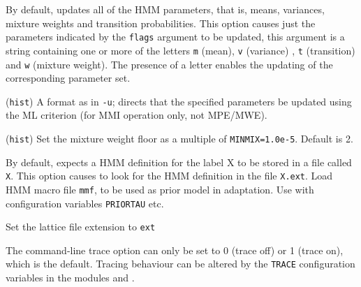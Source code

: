 \begin{optlist}
   By default,  updates all of the HMM parameters,
      that is, means, variances, mixture weights and 
      transition probabilities. This 
      option causes just the parameters indicated by the {\tt flags}
      argument to be updated, this argument is a string containing one
      or more of the letters {\tt m} (mean), {\tt v} (variance) ,
      {\tt t} (transition) and {\tt w} (mixture weight).  The 
      presence of a letter enables
      the updating of the corresponding parameter set.

   (\texttt{hist}) A format as in \texttt{-u}; directs that the specified parameters
     be updated using the ML criterion (for MMI operation only, not MPE/MWE).

   (\texttt{hist}) Set the mixture weight floor as a multiple
    of \texttt{MINMIX=1.0e-5}.  Default is 2.

    By default,  expects a HMM definition for 
      the label X to be stored in a file called {\tt X}.  This
      option causes  to look for the HMM definition in the
      file {\tt X.ext}.
\stdoptB
\stdoptE
\stdoptF
\stdoptH
{}  Load HMM macro file {\tt mmf}, to be used as prior model in adaptation.  Use with configuration variables {\tt PRIORTAU} etc.  
\stdoptI
\stdoptJ
\stdoptM

  Set the lattice file extension to {\tt ext}
\end{optlist}




The command-line trace option can only be set to 0 (trace off)
or 1 (trace on), which is the default.  Tracing behaviour can
be altered by the {\tt TRACE} configuration variables in the modules 
and .



